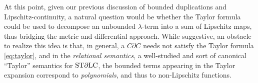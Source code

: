 %
%

At this point, given our previous discussion of bounded duplications and Lipschitz-continuity, a natural question would be whether the Taylor formula
could be used to decompose an unbounded $\lambda$-term 
into a sum of Lipschitz maps, thus bridging the metric and differential approach.  
While suggestive, an obstacle to realize this idea is that,
in general, a $C\partial C$ needs not satisfy the Taylor formula
\eqref{eq:taylor}, and in the \emph{relational semantics}, 
a well-studied and sort of canonical ``Taylor'' semantics for $\mathrm{ST}\partial\mathrm{LC}$, the bounded terms appearing in the Taylor expansion correspond to \emph{polynomials}, and thus to non-Lipschitz functions. 


